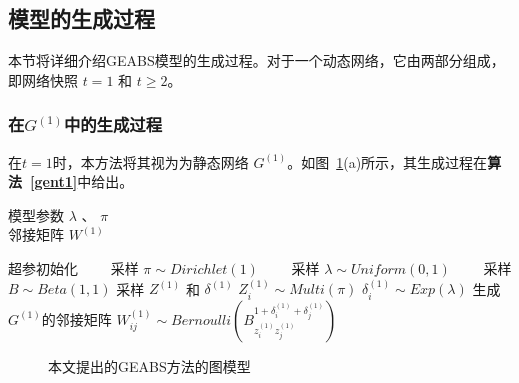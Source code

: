 \subsection{模型的生成过程}

本节将详细介绍GEABS模型的生成过程。对于一个动态网络，它由两部分组成，即网络快照 $t=1$ 和 $t \ge 2$。

\subsubsection{在$G^{(1)}$中的生成过程}
在$t=1$时，本方法将其视为为静态网络 $G^{(1)}$。如图~\ref{fig:graphmodel}(a)所示，其生成过程在\textbf{算法~\ref{gent1}}中给出。

\begin{algorithm}[H]
\caption{$t=1$}\label {gent1}
\algorithmicrequire \; 模型参数 $\lambda$ 、 $\pi$ \\
\algorithmicensure \; 邻接矩阵 $W^{(1)}$
\begin{algorithmic}[1]
\STATE 超参初始化
\STATE ~~~~采样 $\pi \sim Dirichlet (1)$ 
\STATE ~~~~采样 $\lambda \sim Uniform(0,1)$
\STATE ~~~~采样 $B \sim Beta(1,1)$
\STATE 采样 $Z^{(1)}$ 和 $\delta^{(1)}$
\STATE $Z_i^{(1)} \sim Multi(\pi)$
\STATE $\delta^{(1)}_i \sim Exp(\lambda)$
\ENDFOR
\STATE 生成$G^{(1)}$的邻接矩阵
\STATE $W^{(1)}_{ij} \sim Bernoulli(B_{z_i^{(1)} z_j^{(1)}}^{1+\delta_i^{(1)} + \delta_j^{(1)}})$
\ENDFOR
\end{algorithmic}
\end{algorithm}

\begin{figure}[htbp]
    \centering
    \vspace{-0.1in}
    \caption{本文提出的GEABS方法的图模型}
    \label{fig:graphmodel}
\end{figure}



